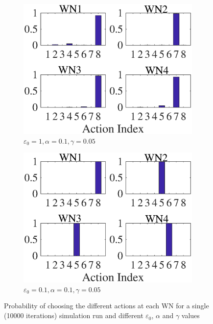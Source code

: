 \documentclass{article}
\begin{document}
\begin{figure}[]
\begin{subfigure}[b]{0.225\textwidth}
			\includegraphics[width=\textwidth]{images/e_1_a_01_g_005}
			\caption{$\varepsilon_0=1, \alpha=0.1, \gamma=0.05$}
			\label{fig:e_1_a_01_g_005}
		\end{subfigure}
		\begin{subfigure}[b]{0.225\textwidth}
			\includegraphics[width=\textwidth]{images/e_01_a_01_g_005}
			\caption{$\varepsilon_0=0.1, \alpha=0.1, \gamma=0.05$}
			\label{fig:e_01_a_01_g_005}
		\end{subfigure}
		\caption{Probability of choosing the different actions at each WN for a single (10000 iterations) simulation run and different $\varepsilon_0$, $\alpha$ and $\gamma$ values}
		\label{fig:ql_params_eval_actions_prob}
	\end{figure}
	
\end{document}
